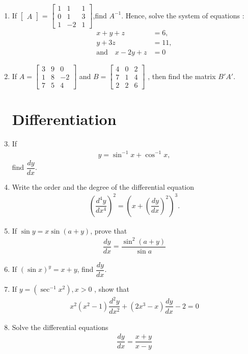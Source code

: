 \documentclass[12pt,-letter paper]{article}
\providecommand{\myvec}[1]{\ensuremath{\begin{bmatrix}#1\end{bmatrix}}}
\providecommand{\brak}[1]{\ensuremath{\left(#1\right)}}
\begin{document}
\begin{enumerate}
\item If \myvec {A} = \myvec{1&1&1\\0&1&3\\1&-2&1},find $A^{-1}$.
Hence, solve the system of equations :
\begin{align*}
    x+y+z&=6 ,\\
    y+3z&=11 ,\\
    \text  {and} \hspace{12pt}x-2y+z&= 0
\end{align*}

\item If $A = \myvec{3&9&0\\1&8&-2\\7&5&4}$ and $B = \myvec{4&0&2\\7&1&4\\2&2&6}$ , then find the matrix $B'A'$.

\section{Differentiation}

\item If
\begin{align*}
    y = \sin ^{-1} {x} + \cos^{-1} {x},
\end{align*}
 find $\dfrac{dy}{dx}$.
 
\item Write the order and the degree of the differential equation
\begin{align*}
    \brak{\dfrac{d^4y}{dx^4}}^2=\brak{x+\brak{\dfrac{dy}{dx}}^2}^3.
\end{align*}

\item If $\sin y = x \sin (a + y)$, prove that 
\begin{align*}
    \dfrac{dy}{dx} =\dfrac{\sin^{2}(a+y)}{\sin {a}}
\end{align*}

\item If $(\sin x)^y= x + y$, find $\dfrac{dy}{dx}$.

\item If $y=\brak{\sec^{-1}{x}^{2}},x>0$ , show that 
\begin{align*}
    x^2(x^2-1)\dfrac{d^{2}y}{dx^{2}}+(2x^{3}-x)\dfrac{dy}{dx}-2=0
\end{align*}

\item Solve the differential equations
\begin{align*}
    \dfrac{dy}{dx}=\dfrac{x+y}{x-y}
\end{align*}


\end{enumerate}
\end{document}
